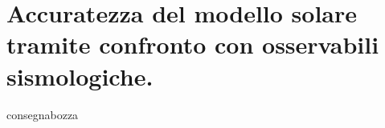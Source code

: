 \documentclass[twoside,11pt,openany,fleqn]{memoir}%
\def\versione{consegna}%
\def\bozza{bozza}
\begin{document}


\cleartorecto
\part{Accuratezza del modello solare tramite confronto con osservabili sismologiche.}



\backmatter

%

\printbibliography

\ifx\versione\bozza
\woc
\erratac
\fi
\end{document}
